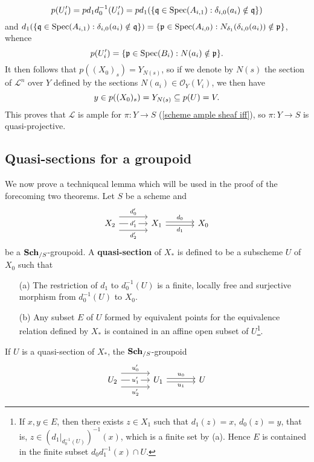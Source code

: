 \begin{remark}
\[p(U'_i)=pd_1d_0^{-1}(U_i')=pd_1(\{\mathfrak{q}\in\mathrm{Spec}(A_{i,1}):\delta_{i,0}(a_i)\notin\mathfrak{q}\})\]
and $d_1(\{\mathfrak{q}\in\mathrm{Spec}(A_{i,1}):\delta_{i,0}(a_i)\notin\mathfrak{q}\})=\{\mathfrak{p}\in\mathrm{Spec}(A_{i,0}):N_{\delta_1}(\delta_{i,0}(a_i))\notin\mathfrak{p}\}$, whence
\[p(U_i')=\{\mathfrak{p}\in\mathrm{Spec}(B_i):N(a_i)\notin\mathfrak{p}\}.\]
It then follows that $p((X_0)_s)=Y_{N(s)}$, so if we denote by $N(s)$ the section of $\mathscr{L}^n$ over $Y$ defined by the sections $N(a_i)\in\mathscr{O}_Y(V_i)$, we then have
\begin{equation}
y\in p((X_0)_s)=Y_{N(s)}\subseteq p(U)=V.
\end{equation} 
This proves that $\mathscr{L}$ is ample for $\pi:Y\to S$ (\cref{scheme ample sheaf iff}), so $\pi:Y\to S$ is quasi-projective.
\end{remark}

\subsection{Quasi-sections for a groupoid}\label{scheme groupoid quotient if quasi-section subsection}
We now prove a techniqucal lemma which will be used in the proof of the forecoming two theorems. Let $S$ be a scheme and
\[\begin{tikzcd}[column sep=12mm]
X_2\ar[r,shift left=8pt,"d_0'"]\ar[r,shift right=8pt,swap,"d_2'"]\ar[r,"d_1'"description]&X_1\ar[r,shift left=2pt,"d_0"]\ar[r,shift right=2pt,swap,"d_1"]&X_0
\end{tikzcd}\]
be a $\mathbf{Sch}_{/S}$-groupoid. A \textbf{quasi-section} of $X_*$ is defined to be a subscheme $U$ of $X_0$ such that
\begin{enumerate}
    \item[(a)] The restriction of $d_1$ to $d_0^{-1}(U)$ is a finite, locally free and surjective morphism from $d_0^{-1}(U)$ to $X_0$.
    \item[(b)] Any subset $E$ of $U$ formed by equivalent points for the equivalence relation defined by $X_*$ is contained in an affine open subset of $U$\footnote{If $x,y\in E$, then there exists $z\in X_1$ such that $d_1(z)=x$, $d_0(z)=y$, that is, $z\in (d_1|_{d_0^{-1}(U)})^{-1}(x)$, which is a finite set by (a). Hence $E$ is contained in the finite subset $d_0d_1^{-1}(x)\cap U$.}.
\end{enumerate}
If $U$ is a quasi-section of $X_*$, the $\mathbf{Sch}_{/S}$-groupoid
\[\begin{tikzcd}[column sep=12mm]
U_2\ar[r,shift left=8pt,"u_0'"]\ar[r,shift right=8pt,swap,"u_2'"]\ar[r,"u_1'"description]&U_1\ar[r,shift left=2pt,"u_0"]\ar[r,shift right=2pt,swap,"u_1"]&U
\end{tikzcd}\]
